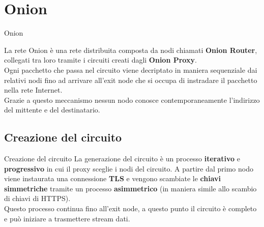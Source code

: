 \section{Onion}
\begin{frame}{Onion}
    \begin{figure}[htpb!]
        \centering
        
    \end{figure}
    La rete Onion è una rete distribuita composta da nodi chiamati \textbf{Onion Router}, collegati tra loro tramite i circuiti creati dagli \textbf{Onion Proxy}. \\
    Ogni pacchetto che passa nel circuito viene decriptato in maniera sequenziale dai relativi nodi fino ad arrivare all'exit node che si occupa di instradare il pacchetto nella rete Internet. \\ 
    Grazie a questo meccanismo nessun nodo conosce contemporaneamente l'indirizzo del mittente e del destinatario.
\end{frame}

\subsection{Creazione del circuito}
\begin{frame}{Creazione del circuito}
    La generazione del circuito è un processo \textbf{iterativo} e \textbf{progressivo} in cui il proxy sceglie i nodi del circuito. 
    A partire dal primo nodo viene instaurata una connessione \textbf{TLS} e vengono scambiate le \textbf{chiavi simmetriche} tramite un processo \textbf{asimmetrico} (in maniera simile allo scambio di chiavi di HTTPS). \\
    Questo processo continua fino all'exit node, a questo punto il circuito è completo e può iniziare a trasmettere stream dati.
\end{frame}
    
\begin{frame}
    \begin{figure}[htpb!]
        \centering
        
    \end{figure}
\end{frame}

